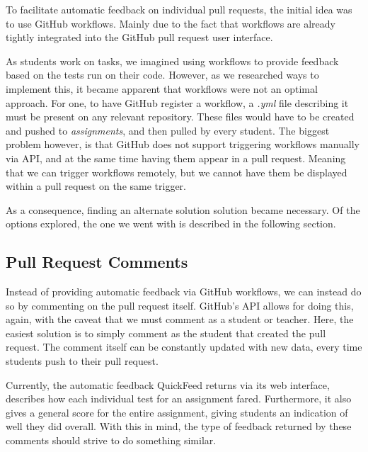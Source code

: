 To facilitate automatic feedback on individual pull requests, the initial idea was to use GitHub workflows.
Mainly due to the fact that workflows are already tightly integrated into the GitHub pull request user interface.

As students work on tasks, we imagined using workflows to provide feedback based on the tests run on their code.
However, as we researched ways to implement this, it became apparent that workflows were not an optimal approach.
For one, to have GitHub register a workflow, a \textit{.yml} file describing it must be present on any relevant repository.
These files would have to be created and pushed to \textit{assignments}, and then pulled by every student.
The biggest problem however, is that GitHub does not support triggering workflows manually via API, and at the same time having them appear in a pull request.
Meaning that we can trigger workflows remotely, but we cannot have them be displayed within a pull request on the same trigger.

As a consequence, finding an alternate solution solution became necessary.
Of the options explored, the one we went with is described in the following section.

\subsection{Pull Request Comments}

Instead of providing automatic feedback via GitHub workflows, we can instead do so by commenting on the pull request itself.
GitHub's API allows for doing this, again, with the caveat that we must comment as a student or teacher.
Here, the easiest solution is to simply comment as the student that created the pull request.
The comment itself can be constantly updated with new data, every time students push to their pull request.

Currently, the automatic feedback QuickFeed returns via its web interface, describes how each individual test for an assignment fared.
Furthermore, it also gives a general score for the entire assignment, giving students an indication of well they did overall.
With this in mind, the type of feedback returned by these comments should strive to do something similar.
